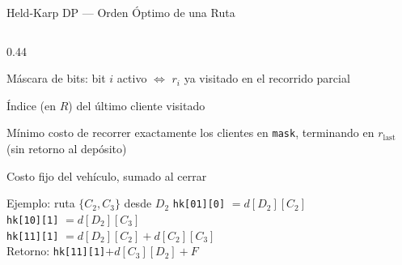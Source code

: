 \documentclass[aspectratio=169,10pt]{beamer}
\begin{document}
\begin{frame}{Held-Karp DP --- Orden Óptimo de una Ruta}
\begin{columns}[T,onlytextwidth]
\begin{column}{0.44\textwidth}
      \vspace{0.2em}
      \begin{description}[\texttt{hk[mask][last]}]\footnotesize
        \item[\texttt{mask}] Máscara de bits: bit $i$ activo $\Leftrightarrow$ $r_i$ ya visitado en el recorrido parcial
        \item[\texttt{last}] Índice (en $R$) del último cliente visitado
        \item[\texttt{hk[mask][last]}] Mínimo costo de recorrer exactamente los clientes en \texttt{mask}, terminando en $r_{\text{last}}$ (sin retorno al depósito)
        \item[$F$] Costo fijo del vehículo, sumado al cerrar
      \end{description}
      \vspace{0.4em}
      \begin{exampleblock}{Ejemplo: ruta $\{C_2, C_3\}$ desde $D_2$}
        \footnotesize
        \texttt{hk[01][0]} $= d[D_2][C_2]$ \\
        \texttt{hk[10][1]} $= d[D_2][C_3]$ \\
        \texttt{hk[11][1]} $= d[D_2][C_2]+d[C_2][C_3]$ \\
        Retorno: \texttt{hk[11][1]}$+d[C_3][D_2]+F$
      \end{exampleblock}
    \end{column}
  \end{columns}
\end{frame}
\end{document}
